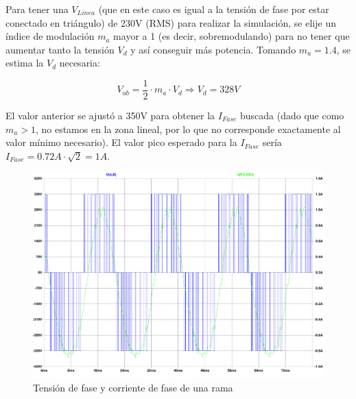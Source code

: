 \documentclass[e4_tp3_main.tex]{subfiles}
\begin{document}
Para tener una $V_{Linea}$ (que en este caso es igual a la tensión de fase por estar conectado en triángulo) de 230V (RMS) para realizar la simulación, se elije un índice de modulación $m_a$ mayor a 1 (es decir, sobremodulando) para no tener que aumentar tanto la tensión $V_d$ y así conseguir más potencia. Tomando $m_a = 1.4$, se estima la $V_d$ necesaria:

\[
V_{ab} = \frac{1}{2} \cdot m_a \cdot V_d \Longrightarrow V_d = 328V
\]

El valor anterior se ajustó a 350V para obtener la $I_{Fase}$ buscada (dado que como $m_a > 1$, no estamos en la zona lineal, por lo que no corresponde exactamente al valor mínimo necesario). El valor pico esperado para la $I_{Fase}$ sería $I_{Fase} = 0.72A \cdot \sqrt{2} = 1A$.

\begin{figure}[H]
\centering
\includegraphics[width=0.9\linewidth]{Imagenes/motorTriangulo.pdf}
\caption{Tensión de fase y corriente de fase de una rama}
\end{figure}
\end{document}

